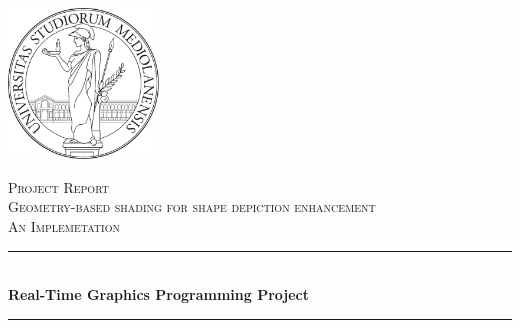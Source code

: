 \begin{titlepage}
	
	\newcommand{\HRule}{\rule{\linewidth}{0.5mm}} %
	
	\centering
	\includegraphics[width=4cm]{Images/logo.png}\\[1cm] %
	
	
	\center %
	
	
	\textsc{\LARGE Project Report}\\[1.5cm] 
	\textsc{\Large Geometry-based shading for shape depiction enhancement}\\[0.3cm] 
	\textsc{\large An Implemetation}\\[0.5cm] 
	
	\makeatletter
	\HRule \\[0.4cm]
	{ \huge \bfseries Real-Time Graphics Programming Project}\\[0.4cm] %
	\HRule \\[1.5cm]
	
	

\end{titlepage}
